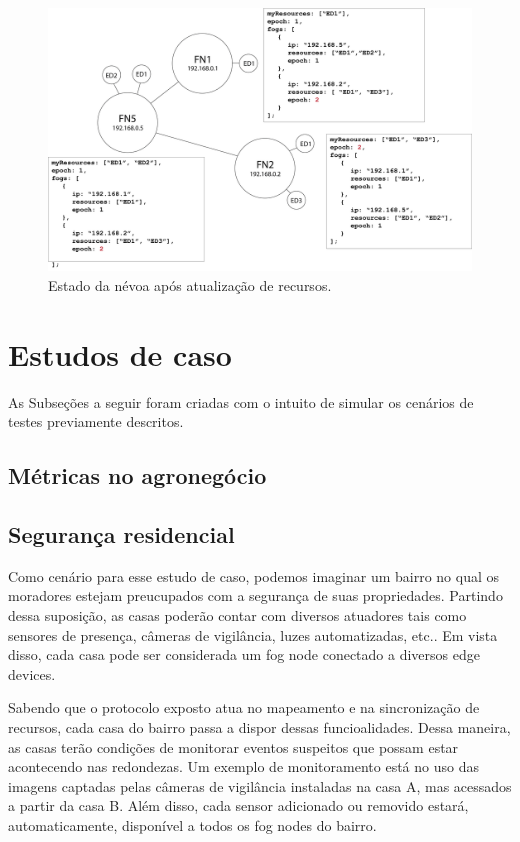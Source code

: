\begin{figure}[H]
    \centering\includegraphics[width=.8\textwidth]{fig11.png} 
    \caption%
    {\label{fig:fig11} Estado da névoa após atualização de recursos.}
\end{figure}


\section{Estudos de caso}

As Subseções a seguir foram criadas com o intuito de simular os cenários de testes previamente descritos.

\subsection{Métricas no agronegócio}

\subsection{Segurança residencial}

Como cenário para esse estudo de caso, podemos imaginar um bairro no qual os moradores estejam preucupados com a segurança de suas propriedades.
Partindo dessa suposição, as casas poderão contar com diversos atuadores tais como sensores de presença, câmeras de vigilância, luzes automatizadas, etc..
Em vista disso, cada casa pode ser considerada um fog node conectado a diversos edge devices.

Sabendo que o protocolo exposto atua no mapeamento e na sincronização de recursos, cada casa do bairro passa a dispor dessas funcioalidades.
Dessa maneira, as casas terão condições de monitorar eventos suspeitos que possam estar acontecendo nas redondezas.
Um exemplo de monitoramento está no uso das imagens captadas pelas câmeras de vigilância instaladas na casa A, mas acessados a partir da casa B.
Além disso, cada sensor adicionado ou removido estará, automaticamente, disponível a todos os fog nodes do bairro.

